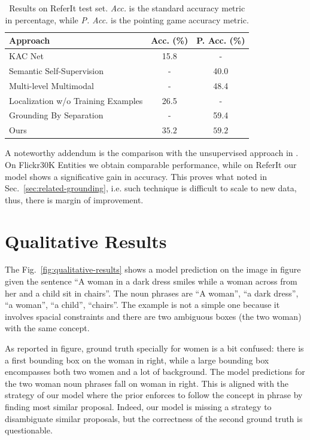 \begin{table}
  \centering
  \begin{tabular}{lcc}
    \toprule
    Approach & Acc. (\%) & P. Acc. (\%) \\
    \midrule
    KAC Net \cite{chen2018knowledge}                         & 15.8 & -    \\
    Semantic Self-Supervision \cite{javed2018learning}       & -    & 40.0 \\
    Multi-level Multimodal \cite{akbari2019multi}            & -    & 48.4 \\
    Localization w/o Training Examples \cite{wang2019phrase} & 26.5 & -    \\
    Grounding By Separation \cite{arbelle2021detector}       & -    & 59.4 \\
    \midrule
    Ours                                                     & $\bm{35.2}$ & $59.2$ \\
    \bottomrule
  \end{tabular}
  \caption[Results on ReferIt test set]{Results on
  ReferIt test set. \textit{Acc.} is the standard accuracy
  metric in percentage, while \textit{P. Acc.} is the pointing game
  accuracy metric.}
  \label{tab:results-referit}
\end{table}

A noteworthy addendum is the comparison with the unsupervised approach
in \cite{wang2019phrase}. On Flickr30K Entities we obtain comparable
performance, while on ReferIt our model shows a significative gain in
accuracy. This proves what noted in Sec.~\ref{sec:related-grounding},
i.e. such technique is difficult to scale to new data, thus, there is
margin of improvement.

\section{Qualitative Results}

The Fig.~\ref{fig:qualitative-results} shows a model prediction on the
image in figure given the sentence ``A woman in a dark dress smiles
while a woman across from her and a child sit in chairs''. The noun
phrases are ``A woman'', ``a dark dress'', ``a woman'', ``a child'',
``chairs''. The example is not a simple one because it involves
spacial constraints and there are two ambiguous boxes (the two woman)
with the same concept. 

As reported in figure, ground truth specially for women is a bit
confused: there is a first bounding box on the woman in right, while a
large bounding box encompasses both two women and a lot of background.
The model predictions for the two woman noun phrases fall on woman in
right. This is aligned with the strategy of our model where the prior
enforces to follow the concept in phrase by finding most similar
proposal. Indeed, our model is missing a strategy to disambiguate
similar proposals, but the correctness of the second ground truth is
questionable.

